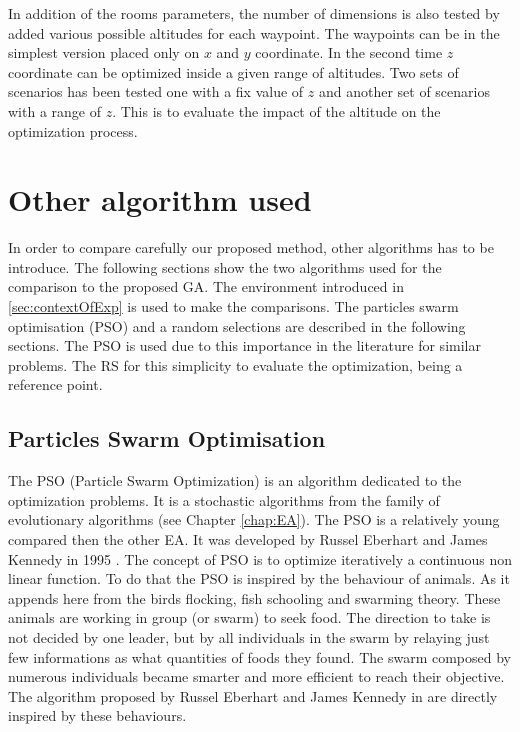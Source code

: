  

 In addition of the rooms parameters, the number of dimensions is also tested by added various possible altitudes for each waypoint. The waypoints can be in the simplest version placed only on $x$ and $y$ coordinate. In the second time $z$ coordinate can be optimized inside a given range of altitudes. 
 Two sets of scenarios has been tested one with a fix value of $z$ and another set of scenarios with a range of $z$.  This is to evaluate the impact of the altitude on the optimization process.



\section{Other algorithm used}

In order to compare carefully our proposed method, other algorithms has to be introduce. The following sections show the two algorithms used for the comparison to the proposed GA. The environment introduced in \ref{sec:contextOfExp} is used to make the comparisons.  
The particles swarm optimisation (PSO) and a random selections are described in the following sections. The PSO is used due to this importance in the literature for similar problems. The RS for this simplicity to evaluate the optimization, being a reference point.  

\subsection{Particles Swarm Optimisation } \label{sec:PSOdetail}

The PSO (Particle Swarm Optimization) is an algorithm dedicated to the optimization problems. It is a stochastic algorithms from the family of evolutionary algorithms (see Chapter \ref{chap:EA}). 
The PSO is a relatively young compared then the other EA. It was developed by Russel Eberhart and James Kennedy in 1995 \cite{148*eberhart1995}. The concept of PSO is to optimize iteratively a continuous non linear function. To do that the PSO is inspired by the behaviour of animals. As it appends here from the birds flocking, fish schooling and swarming theory. These  animals are working in group (or swarm) to seek food. 
The direction to take is not decided by one leader, but by all individuals in the swarm by relaying just few informations as what quantities of foods they found. 
The swarm composed by numerous individuals became smarter and more efficient to reach their objective. 
The algorithm proposed by Russel Eberhart and James Kennedy in  \cite{148*eberhart1995} are directly inspired by these behaviours.

